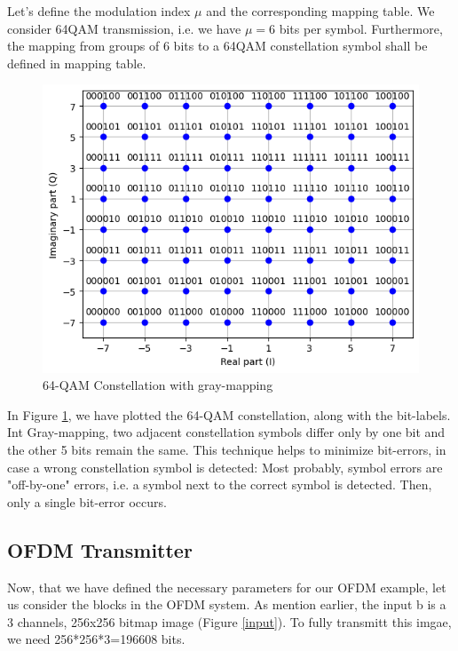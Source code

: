 Let's define the modulation index $\mu$ and the corresponding mapping table. We consider 64QAM transmission, i.e. we have $\mu=6$ bits per symbol. Furthermore, the mapping from groups of 6 bits to a 64QAM constellation symbol shall be defined in mapping table.

\begin{figure}[ht]
    \centering
    \includegraphics[width=\textwidth]{../Source/results/mapping}
    \caption{64-QAM Constellation with gray-mapping}
    \label{mapping}
\end{figure}

In Figure \ref{mapping}, we have plotted the 64-QAM constellation, along with the bit-labels.
Int Gray-mapping, two adjacent constellation symbols differ only by one bit and the other 5 bits remain the same. This technique helps to minimize bit-errors, in case a wrong constellation symbol is detected: Most probably, symbol errors are "off-by-one" errors, i.e. a symbol next to the correct symbol is detected. Then, only a single bit-error occurs.

\subsection{OFDM Transmitter}

Now, that we have defined the necessary parameters for our OFDM example, let us consider the blocks in the OFDM system. As mention earlier, the input b is a 3 channels, 256x256 bitmap image (Figure \ref{input}). To fully transmitt this imgae, we need 256*256*3=196608 bits.

